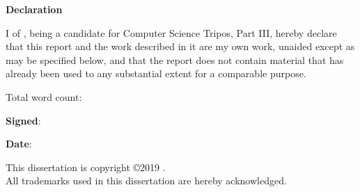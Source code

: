 \newpage
{\Huge \bf Declaration}

\vspace{24pt} 

I \authorname of \authorcollege, being a candidate for Computer Science Tripos, Part III, hereby declare that this report and the
work described in it are my own work, unaided except as may be
specified below, and that the report does not contain material that
has already been used to any substantial extent for a comparable
purpose.

\vspace{24pt}
Total word count: \wordcount

\vspace{60pt}
\textbf{Signed}: 

\vspace{12pt}
\textbf{Date}:


\vfill

This dissertation is copyright \copyright 2019 \authorname. 
\\
All trademarks used in this dissertation are hereby acknowledged.



\newpage
\vspace*{\fill}
